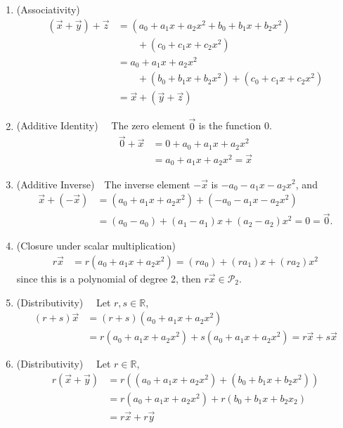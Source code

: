 \begin{example}
\begin{enumerate}
\item (Associativity)
\begin{align*}
 (\vec{x} + \vec{y}) + \vec{z} & = (a_0 + a_1 x + a_2 x^2+ b_0 + b_1 x + b_2 x^2) \\
 & \qquad+ (c_0 + c_1 x + c_2 x^2) \\
 & = a_0 + a_1 x + a_2 x^2 \\
 & \qquad + (b_0 + b_1 x + b_2 x^2) + (c_0 + c_1 x + c_2 x^2) \\
 & = \vec{x} + (\vec{y} + \vec{z}) 
\end{align*} 

\item (Additive Identity) ~~The zero element $\vec{0}$ is the function 0.  
% 
\begin{align*}
 \vec{0} + \vec{x} & = 0 + a_0 + a_1 x + a_2 x^2 \\
 & = a_0 + a_1 x + a_2 x^2 = \vec{x} 
\end{align*}

\item (Additive Inverse)~~The inverse element $-\vec{x}$ is $-a_0 - a_1 x-a_2x^2$, and 
\begin{align*}
\vec{x} + (-\vec{x}) & = (a_0 + a_1 x + a_2 x^2) + (-a_0 - a_1 x-a_2x^2) \\
& = (a_0 -a_0) + (a_1 -a_1) x + (a_2 -a_2) x^2 = 0 = \vec{0}. 
\end{align*}

\item (Closure under scalar multiplication)
\begin{align*}
r \vec{x} & = r(a_0 + a_1 x + a_2 x^2) = (ra_0) + (ra_1) x + (ra_2) x^2
\end{align*}
since this is a polynomial of degree 2, then $r \vec{x} \in \mathcal{P}_2$.  

\item (Distributivity) ~~Let $r, s \in \mathbb{R}$, 
%
\begin{align*}
(r + s) \vec{x} & = (r+s) (a_0 + a_1 x + a_2 x^2) \\
& = r (a_0 + a_1 x + a_2 x^2) + s (a_0 + a_1 x + a_2 x^2) = r \vec{x} + s \vec{x}
\end{align*}

\item (Distributivity) ~~Let $r \in \mathbb{R}$, 
%
\begin{align*}
r (\vec{x} + \vec{y}) & = r ((a_0 + a_1 x + a_2 x^2) + (b_0 + b_1 x + b_2 x^2)) \\
& =r (a_0 + a_1 x + a_2 x^2) + r (b_0 + b_1 x + b_2 x_2)  \\
& = r \vec{x} + r \vec{y} 
\end{align*}


\end{enumerate}
\end{example}
